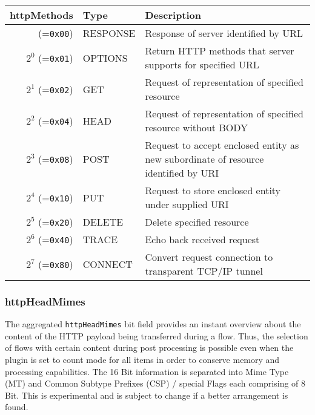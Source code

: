 \documentclass[documentation]{subfiles}
\begin{document}
\begin{longtable}{rll}
    \toprule
    {\bf httpMethods} & {\bf Type} & {\bf Description}\\
    \midrule\endhead%
          (={\tt 0x00}) & RESPONSE & Response of server identified by URL\\
    $2^0$ (={\tt 0x01}) & OPTIONS & Return HTTP methods that server supports for specified URL\\
    $2^1$ (={\tt 0x02}) & GET & Request of representation of specified resource \\
    $2^2$ (={\tt 0x04}) & HEAD & Request of representation of specified resource without BODY \\
    $2^3$ (={\tt 0x08}) & POST & Request to accept enclosed entity as new subordinate of resource identified by URI \\
    $2^4$ (={\tt 0x10}) & PUT & Request to store enclosed entity under supplied URI \\
    $2^5$ (={\tt 0x20}) & DELETE & Delete specified resource \\
    $2^6$ (={\tt 0x40}) & TRACE & Echo back received request \\
    $2^7$ (={\tt 0x80}) & CONNECT & Convert request connection to transparent TCP/IP tunnel \\
    \bottomrule
\end{longtable}

\subsubsection{httpHeadMimes}\label{httpHeadMimes}
The aggregated {\tt httpHeadMimes} bit field provides an instant overview
about the content of the HTTP payload being transferred during a flow. Thus, the
selection of flows with certain content during post processing is possible even when
the plugin is set to count mode for all items in order to conserve memory and processing
capabilities. The 16 Bit information is separated into Mime Type (MT) and Common Subtype Prefixes (CSP) /
 special Flags each comprising of 8 Bit. This is experimental and is subject to change if a better arrangement is found.
\end{document}
